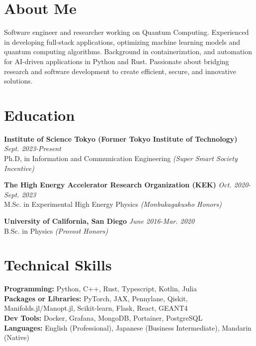\documentclass[a4paper,10pt]{article}
\begin{document}
\thispagestyle{firstpage} %
\vspace*{-4em} %

\section*{About Me}
\textcolor{textgray}{
 Software engineer and researcher working on Quantum Computing. Experienced in developing full-stack applications, optimizing machine learning models and quantum computing algorithms. Background in containerization, and automation for AI-driven applications in Python and Rust. Passionate about bridging research and software development to create efficient, secure, and innovative solutions.
}

\section*{Education}
\textbf{Institute of Science Tokyo (Former Tokyo Institute of Technology)} \hfill {\em Sept. 2023-Present} \\
Ph.D, in Information and Communication Engineering \textit{\color{accentgreen}(Super Smart Society Incentive)}

\textbf{The High Energy Accelerator Research Organization (KEK)} \hfill {\em Oct. 2020-Sept. 2023} \\
M.Sc. in Experimental High Energy Physics \textit{\color{accentgreen}(Monbukagakusho Honors)}

\textbf{University of California, San Diego} \hfill {\em June 2016-Mar. 2020} \\
B.Sc. in Physics \textit{\color{accentgreen}(Provost Honors)}

\section*{Technical Skills}
\textbf{Programming:} Python, C++, Rust, Typescript, Kotlin, Julia\\
\textbf{Packages or Libraries:} PyTorch, JAX, Pennylane, Qiskit, Manifolds.jl/Manopt.jl, Scikit-learn, Flask, React, GEANT4\\
\textbf{Dev Tools:} Docker, Grafana, MongoDB, Portainer, PostgreSQL\\
\textbf{Languages:} English (Professional), Japanese (Business Intermediate), Mandarin (Native)
\end{document}
